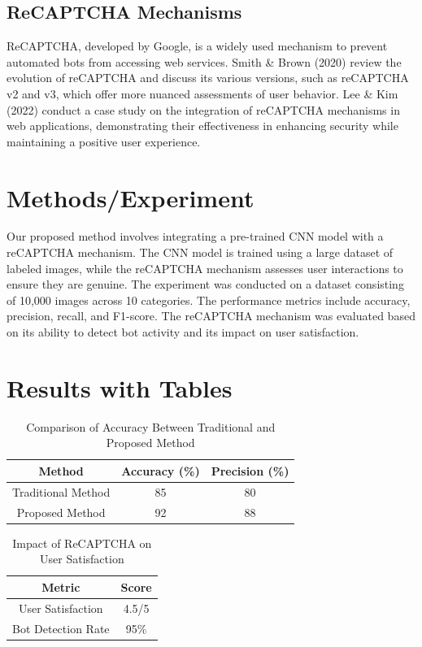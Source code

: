\documentclass{article}
\begin{document}
\subsection{ReCAPTCHA Mechanisms}
ReCAPTCHA, developed by Google, is a widely used mechanism to prevent automated bots from accessing web services. Smith \& Brown (2020) review the evolution of reCAPTCHA and discuss its various versions, such as reCAPTCHA v2 and v3, which offer more nuanced assessments of user behavior. Lee \& Kim (2022) conduct a case study on the integration of reCAPTCHA mechanisms in web applications, demonstrating their effectiveness in enhancing security while maintaining a positive user experience.

\section{Methods/Experiment}
Our proposed method involves integrating a pre-trained CNN model with a reCAPTCHA mechanism. The CNN model is trained using a large dataset of labeled images, while the reCAPTCHA mechanism assesses user interactions to ensure they are genuine. The experiment was conducted on a dataset consisting of 10,000 images across 10 categories. The performance metrics include accuracy, precision, recall, and F1-score. The reCAPTCHA mechanism was evaluated based on its ability to detect bot activity and its impact on user satisfaction.

\section{Results with Tables}
\begin{table}[ht]
\centering
\caption{Comparison of Accuracy Between Traditional and Proposed Method}
\label{tab:accuracy}
\begin{tabular}{|c|c|c|}
\hline
\textbf{Method} & \textbf{Accuracy} (\%) & \textbf{Precision} (\%) \\
\hline
Traditional Method & 85 & 80 \\
Proposed Method & 92 & 88 \\
\hline
\end{tabular}
\end{table}

\begin{table}[ht]
\centering
\caption{Impact of ReCAPTCHA on User Satisfaction}
\label{tab:user_satisfaction}
\begin{tabular}{|c|c|}
\hline
\textbf{Metric} & \textbf{Score} \\
\hline
User Satisfaction & 4.5/5 \\
Bot Detection Rate & 95\% \\
\hline
\end{tabular}
\end{table}
\end{document}
